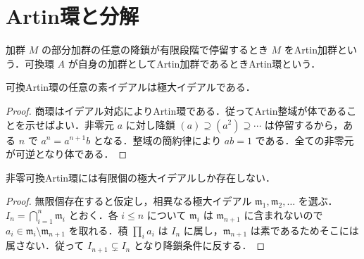 \section{Artin環と分解}
\begin{defn}[Artin加群及びArtin環]
加群 $M$ の部分加群の任意の降鎖が有限段階で停留するとき $M$ をArtin加群という．可換環 $A$ が自身の加群としてArtin加群であるときArtin環という．
\end{defn}
\begin{prop}[Artin環の素イデアル]
可換Artin環の任意の素イデアルは極大イデアルである．
\end{prop}
\begin{proof}
商環はイデアル対応によりArtin環である．従ってArtin整域が体であることを示せばよい．非零元 $a$ に対し降鎖 $(a)\supseteq(a^2)\supseteq\cdots$ は停留するから，ある $n$ で $a^n=a^{n+1}b$ となる．整域の簡約律により $ab=1$ である．全ての非零元が可逆となり体である．
\end{proof}
\begin{prop}[極大イデアルの有限性]
非零可換Artin環には有限個の極大イデアルしか存在しない．
\end{prop}
\begin{proof}
無限個存在すると仮定し，相異なる極大イデアル $\mathfrak m_1,\mathfrak m_2,\ldots$ を選ぶ．$I_n=\bigcap_{i=1}^n\mathfrak m_i$ とおく．各 $i\leq n$ について $\mathfrak m_i$ は $\mathfrak m_{n+1}$ に含まれないので $a_i\in\mathfrak m_i\setminus\mathfrak m_{n+1}$ を取れる．積 $\prod_i a_i$ は $I_n$ に属し，$\mathfrak m_{n+1}$ は素であるためそこには属さない．従って $I_{n+1}\subsetneq I_n$ となり降鎖条件に反する．
\end{proof}
